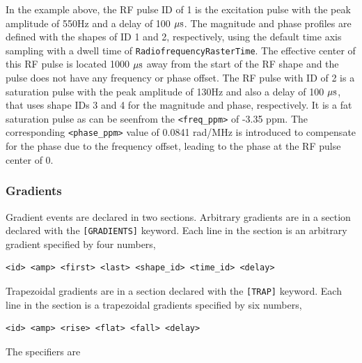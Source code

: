 \documentclass{article}
\begin{document}
In the example above, the RF pulse ID of 1 is the excitation pulse with the peak amplitude of 550Hz and a delay of 100 $\rm \mu s$. The magnitude and phase profiles are defined with the shapes of ID 1 and 2, respectively, using the default time axis sampling with a dwell time of \verb.RadiofrequencyRasterTime.. The effective center of this RF pulse is located 1000 $\rm \mu s$ away from the start of the RF shape and the pulse does not have any frequency or phase offset. The RF pulse with ID of 2 is a saturation pulse with the peak amplitude of 130Hz and also a delay of 100 $\rm \mu s$, that uses shape IDs 3 and 4 for the magnitude and phase, respectively. It is a fat saturation pulse as can be seenfrom the \verb.<freq_ppm>. of -3.35 ppm. The corresponding  \verb.<phase_ppm>. value of 0.0841 rad/MHz is introduced to compensate for the phase due to the frequency offset, leading to the phase at the RF pulse center of 0.\\

\subsubsection{Gradients}
Gradient events are declared in two sections. Arbitrary gradients are in a section declared with the \verb.[GRADIENTS]. keyword. Each line in the section is an arbitrary gradient specified by four numbers,
\begin{lstlisting}
<id> <amp> <first> <last> <shape_id> <time_id> <delay>
\end{lstlisting}
Trapezoidal gradients are in a section declared with the \verb.[TRAP]. keyword. Each line in the section is a trapezoidal gradients specified by six numbers,
\begin{lstlisting}
<id> <amp> <rise> <flat> <fall> <delay>
\end{lstlisting}

The specifiers are
\end{document}
